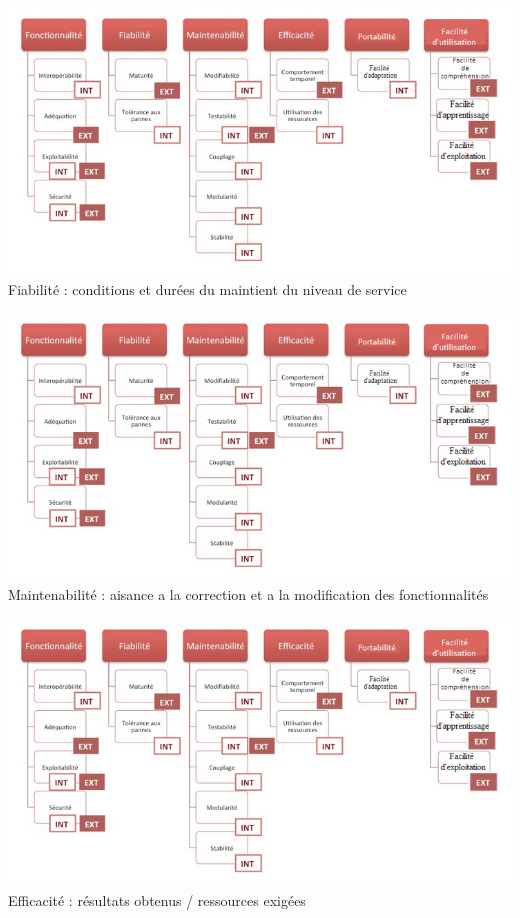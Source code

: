 \documentclass[french]{beamer}%
\begin{document}
			\begin{frame}
				\includegraphics[scale = 0.4]{indicateurs.jpg}
				\newline
				Fiabilité : conditions et durées du maintient du niveau de service
			\end{frame}
			
			\begin{frame}
				\includegraphics[scale = 0.4]{indicateurs.jpg}
				\newline
				Maintenabilité : aisance a la correction et a la modification des fonctionnalités
			\end{frame}
			
			\begin{frame}
				\includegraphics[scale = 0.4]{indicateurs.jpg}
				\newline
				Efficacité : résultats obtenus / ressources exigées
			\end{frame}
			
\end{document}

